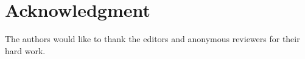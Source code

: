 \documentclass[journal]{IEEEtran}
\begin{document}






%





\section*{Acknowledgment}
The authors would like to thank the editors and anonymous reviewers for their hard work.
\end{document}
